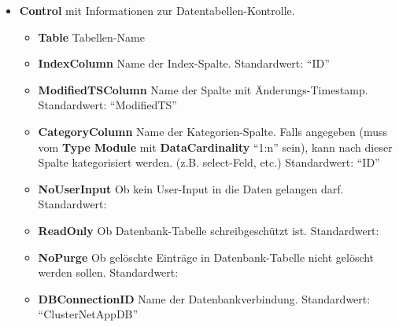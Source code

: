             \begin{itemize}
                \item \textbf{Control}
                     mit Informationen zur Datentabellen-Kontrolle.
                    \begin{itemize}
                        \item \textbf{Table}\superscript{*}  Tabellen-Name
                        \item \textbf{IndexColumn}\superscript{*}  Name der Index-Spalte. Standardwert: ``ID''
                        \item \textbf{ModifiedTSColumn}\superscript{*}  Name der Spalte mit Änderungs-Timestamp. Standardwert: ``ModifiedTS''
                        \item \textbf{CategoryColumn}\superscript{*}  Name der Kategorien-Spalte. Falls angegeben (muss vom \textbf{Type} \textbf{Module} mit \textbf{DataCardinality} ``1:n'' sein), kann nach
                        dieser Spalte kategorisiert werden. (z.B. select-Feld, etc.) Standardwert: ``ID''
                        \item \textbf{NoUserInput}\superscript{*}  Ob kein User-Input in die Daten gelangen darf. Standardwert:  
                        \item \textbf{ReadOnly}\superscript{*}  Ob Datenbank-Tabelle schreibgeschützt ist. Standardwert:  
                        \item \textbf{NoPurge}\superscript{*}  Ob gelöschte Einträge in Datenbank-Tabelle nicht gelöscht werden sollen. Standardwert:  
                        \item \textbf{DBConnectionID}\superscript{*}  Name der Datenbankverbindung. Standardwert: ``ClusterNetAppDB''


\end{itemize}
\end{itemize}

